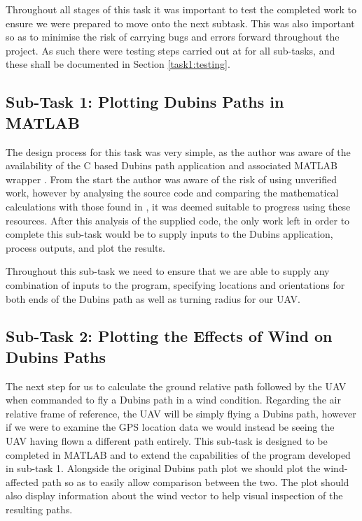 Throughout all stages of this task it was important to test the completed work to ensure we were prepared to move onto the next subtask. This was also important so as to minimise the risk of carrying bugs and errors forward throughout the project. As such there were testing steps carried out at for all sub-tasks, and these shall be documented in Section \ref{task1:testing}. 

\subsection{Sub-Task 1: Plotting Dubins Paths in MATLAB}
\label{task1:design:subtask1}

The design process for this task was very simple, as the author was aware of the availability of the C based Dubins path application and associated MATLAB wrapper \cite{WalkerDubinsCurves,MexDubinsCurves}. From the start the author was aware of the risk of using unverified work, however by analysing the source code and comparing the mathematical calculations with those found in \cite{shkel2001classification}, it was deemed suitable to progress using these resources. After this analysis of the supplied code, the only work left in order to complete this sub-task would be to supply inputs to the Dubins application, process outputs, and plot the results.

Throughout this sub-task we need to ensure that we are able to supply any combination of inputs to the program, specifying locations and orientations for both ends of the Dubins path as well as turning radius for our UAV.

\subsection{Sub-Task 2: Plotting the Effects of Wind on Dubins Paths}
\label{task1:design:subtask2}

The next step for us to calculate the ground relative path followed by the UAV when commanded to fly a Dubins path in a wind condition. Regarding the air relative frame of reference, the UAV will be simply flying a Dubins path, however if we were to examine the GPS location data we would instead be seeing the UAV having flown a different path entirely. This sub-task is designed to be completed in MATLAB and to extend the capabilities of the program developed in sub-task 1. Alongside the original Dubins path plot we should plot the wind-affected path so as to easily allow comparison between the two. The plot should also display information about the wind vector to help visual inspection of the resulting paths. 


